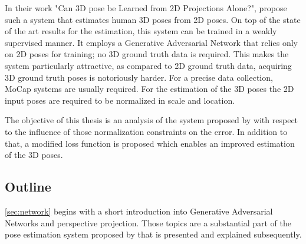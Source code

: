 In their work "Can 3D pose be Learned from 2D Projections Alone?", \citet{drover18} propose such a system that estimates human 3D poses from 2D poses.
On top of the state of the art results for the estimation, this system can be trained in a weakly supervised manner.
It employs a Generative Adversarial Network \cite{goodfellow14} that relies only on 2D poses for training; no 3D ground truth data is required.
This makes the system particularly attractive, as compared to 2D ground truth data, acquiring 3D ground truth poses is notoriously harder.
For a precise data collection, MoCap systems are usually required.
For the estimation of the 3D poses the 2D input poses are required to be normalized in scale and location.

The objective of this thesis is an analysis of the system proposed by \citet{drover18} with respect to the influence of those normalization constraints on the error.
In addition to that, a modified loss function is proposed which enables an improved estimation of the 3D poses.


%
%
%
%



\subsection{Outline}

\autoref{sec:network} begins with a short introduction into Generative Adversarial Networks and perspective projection.
Those topics are a substantial part of the pose estimation system proposed by \citet{drover18} that is presented and explained subsequently.

